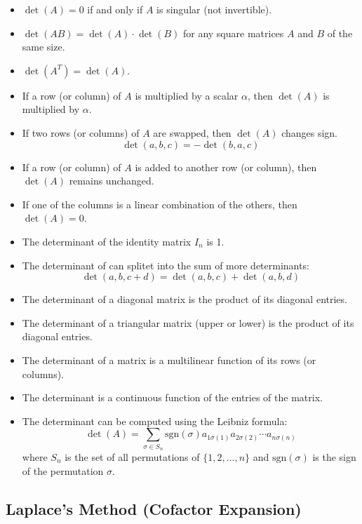 \begin{itemize}[label=\(-\)]
    \item \(\det(A) = 0\) if and only if \(A\) is singular (not invertible).
    \item \(\det(AB) = \det(A) \cdot \det(B)\) for any square matrices \(A\) and \(B\) of the same size.
    \item \(\det(A^T) = \det(A)\).
    \item If a row (or column) of \(A\) is multiplied by a scalar \(\alpha\), then \(\det(A)\) is multiplied by \(\alpha\).
    \item If two rows (or columns) of \(A\) are swapped, then \(\det(A)\) changes sign.
    \[\det(a,b,c) = - \det(b,a,c)\]
    \item If a row (or column) of \(A\) is added to another row (or column), then \(\det(A)\) remains unchanged.
    \item If one of the columns is a linear combination of the others, then \(\det(A) = 0\).
    \item The determinant of the identity matrix \(I_n\) is 1.
    \item The determinant of can splitet into the sum of more determinants:
    \[
    \det(a,b,c + d) = \det(a,b,c) + \det(a,b,d)
    \]
    \item The determinant of a diagonal matrix is the product of its diagonal entries.
    \item The determinant of a triangular matrix (upper or lower) is the product of its diagonal entries.
    \item The determinant of a matrix is a multilinear function of its rows (or columns).
    \item The determinant is a continuous function of the entries of the matrix.
    \item The determinant can be computed using the Leibniz formula:
    \begin{equation*}
    \det(A) = \sum_{\sigma \in S_n} \text{sgn}(\sigma) a_{1\sigma(1)} a_{2\sigma(2)} \cdots a_{n\sigma(n)}
    \end{equation*}
    where \(S_n\) is the set of all permutations of \(\{1, 2, \ldots, n\}\) and \(\text{sgn}(\sigma)\) is the sign of the permutation \(\sigma\). 
\end{itemize}

\subsection{Laplace's Method (Cofactor Expansion)}

